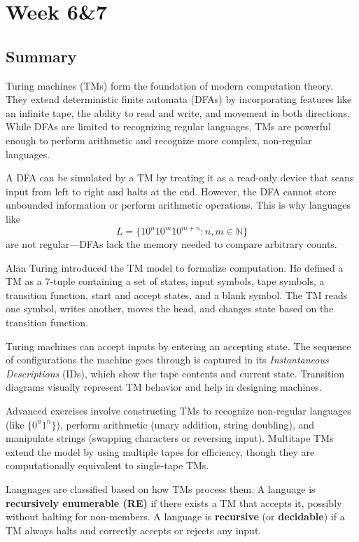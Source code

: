 \documentclass{article}
\begin{document}
\section{Week 6&7}
\subsection{Summary}
Turing machines (TMs) form the foundation of modern computation theory. They extend deterministic finite automata (DFAs) by incorporating features like an infinite tape, the ability to read and write, and movement in both directions. While DFAs are limited to recognizing regular languages, TMs are powerful enough to perform arithmetic and recognize more complex, non-regular languages.

A DFA can be simulated by a TM by treating it as a read-only device that scans input from left to right and halts at the end. However, the DFA cannot store unbounded information or perform arithmetic operations. This is why languages like 
\[
L = \{10^n10^m10^{m+n} : n, m \in \mathbb{N}\}
\]
are not regular—DFAs lack the memory needed to compare arbitrary counts.

Alan Turing introduced the TM model to formalize computation. He defined a TM as a 7-tuple containing a set of states, input symbols, tape symbols, a transition function, start and accept states, and a blank symbol. The TM reads one symbol, writes another, moves the head, and changes state based on the transition function.

Turing machines can accept inputs by entering an accepting state. The sequence of configurations the machine goes through is captured in its \textit{Instantaneous Descriptions} (IDs), which show the tape contents and current state. Transition diagrams visually represent TM behavior and help in designing machines.

Advanced exercises involve constructing TMs to recognize non-regular languages (like \( \{0^n1^n\} \)), perform arithmetic (unary addition, string doubling), and manipulate strings (swapping characters or reversing input). Multitape TMs extend the model by using multiple tapes for efficiency, though they are computationally equivalent to single-tape TMs.

Languages are classified based on how TMs process them. A language is \textbf{recursively enumerable (RE)} if there exists a TM that accepts it, possibly without halting for non-members. A language is \textbf{recursive} (or \textbf{decidable}) if a TM always halts and correctly accepts or rejects any input.
\end{document}
